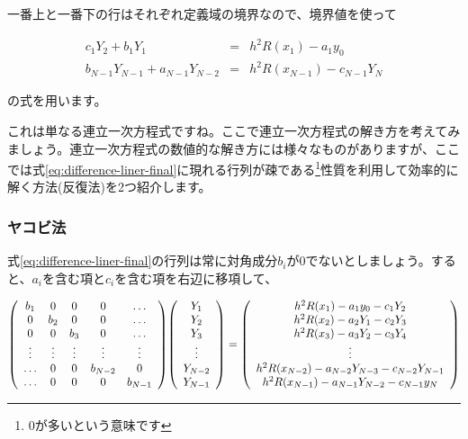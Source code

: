 一番上と一番下の行はそれぞれ定義域の境界なので、境界値を使って

\begin{eqnarray}
    c_1Y_2+b_1Y_1&=&h^2R(x_1)-a_1y_0 \\
    b_{N-1}Y_{N-1}+a_{N-1}Y_{N-2}&=&h^2R(x_{N-1})-c_{N-1}Y_N
\end{eqnarray}

\noindent
の式を用います。

これは単なる連立一次方程式ですね。ここで連立一次方程式の解き方を考えてみましょう。連立一次方程式の数値的な解き方には様々なものがありますが、ここでは式\ref{eq:difference-liner-final}に現れる行列が疎である\footnote{0が多いという意味です}性質を利用して効率的に解く方法(反復法)を2つ紹介します。







\subsubsection{ヤコビ法}
\label{jacobian}
式\ref{eq:difference-liner-final}の行列は常に対角成分$b_i$が0でないとしましょう。すると、$a_i$を含む項と$c_i$を含む項を右辺に移項して、

\begin{eqnarray}
    \pqty{\begin{array}{ccccc}
        b_1 & 0 & 0 & 0 & \hdots \\
        0 & b_2 & 0 & 0 & \hdots \\
        0 & 0 & b_3 & 0 & \hdots \\
        \vdots & \vdots & \vdots & \vdots & \vdots \\
        \hdots & 0 & 0 & b_{N-2} & 0 \\
        \hdots & 0 & 0 & 0 & b_{N-1}
    \end{array}}
    \pqty{\begin{array}{c}
        Y_1 \\
        Y_2 \\
        Y_3 \\
        \vdots \\
        Y_{N-2} \\
        Y_{N-1}
    \end{array}}
    =\pqty{\begin{array}{c}
        h^2R(x_1)-a_1y_0-c_1Y_2 \\
        h^2R(x_2)-a_2Y_1-c_2Y_3 \\
        h^2R(x_3)-a_3Y_2-c_3Y_4 \\
        \vdots \\
        h^2R(x_{N-2})-a_{N-2}Y_{N-3}-c_{N-2}Y_{N-1} \\
        h^2R(x_{N-1})-a_{N-1}Y_{N-2}-c_{N-1}y_N
    \end{array}}
\end{eqnarray}

